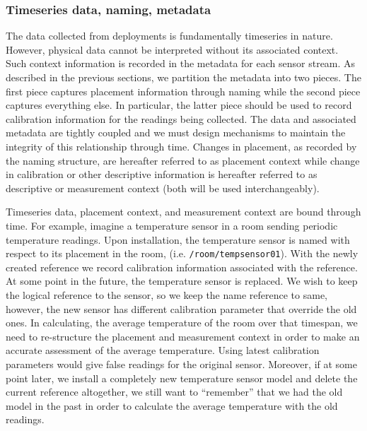 \subsubsection{Timeseries data, naming, metadata}
The data collected from deployments is fundamentally timeseries in nature.  However, physical data cannot be interpreted without its associated context.
Such context information is recorded in the metadata for each sensor stream.  As described in the previous sections, we partition the metadata into two
pieces.  The first piece captures placement information through naming while the second piece captures everything else.  In particular, the latter piece
should be used to record calibration information for the readings being collected.  The data and associated metadata are tightly coupled and we
must design mechanisms to maintain the integrity of this relationship through time.  Changes in placement, as recorded by the naming structure, are 
hereafter referred to as placement context while change in calibration or other descriptive information is hereafter referred to as descriptive or 
measurement context (both will be used interchangeably).

Timeseries data, placement context, and measurement context are bound through time.  For example, imagine a temperature sensor in a room sending periodic
temperature readings.  Upon installation, the temperature sensor is named with respect to its placement in the room, (i.e. {\tt /room/tempsensor01}).
With the newly created reference we record calibration information associated with the reference.  At some point in the future, the temperature sensor
is replaced.  We wish to keep the logical reference to the sensor, so we keep the name reference to same, however, the new sensor has different calibration
parameter that override the old ones.  In calculating, the average temperature of the room over that timespan, we need to re-structure the placement and measurement context in order to make an accurate assessment of the average temperature.  Using latest calibration parameters would give false readings
for the original sensor.  Moreover, if at some point later, we install a completely new temperature sensor model and delete the current reference altogether,
we still want to ``remember'' that we had the old model in the past in order to calculate the average temperature with the old readings.


